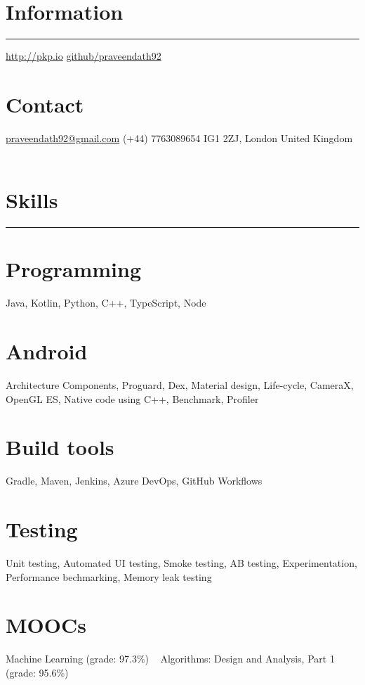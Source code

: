 \documentclass[]{friggeri-cv}
\begin{document}

\begin{aside}
    \section{Information}
        \noindent\rule{3cm}{0.5pt}
        \href{http://pkp.io}{http://pkp.io}
        \href{https://github.com/praveendath92}{github/praveendath92}
    \section{Contact}
        \href{mailto:praveendath92@gmail.com}{praveendath92@gmail.com}
        (+44) 7763089654
        IG1 2ZJ, London
        United Kingdom
    ~
    \section{Skills}
        \noindent\rule{3cm}{0.5pt}
    \section{Programming}
        Java, Kotlin, Python, C++, TypeScript, Node
    \section{Android}
        Architecture Components, Proguard, Dex, Material design, Life-cycle, CameraX, OpenGL ES, Native code using C++, Benchmark, Profiler
    \section{Build tools}
        Gradle, Maven, Jenkins, Azure DevOps, GitHub Workflows
    \section{Testing}
        Unit testing, Automated UI testing, Smoke testing, AB testing, Experimentation, Performance bechmarking, Memory leak testing
    \section{MOOCs}
        Machine Learning 
        (grade: 97.3\%)
        ~
        Algorithms: Design and Analysis, Part 1 
        (grade: 95.6\%)
\end{aside}
~
\end{document}

